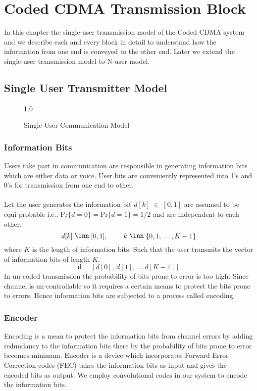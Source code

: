 \chapter{Coded CDMA Transmission Block}
In this chapter the single-user transmission model of the Coded CDMA system and we describe each and every block in detail to understand how the information from one end is conveyed to the other end. Later we extend the single-user transmission model to N-user model.
\section{Single User Transmitter Model}
\begin{figure}[htb]
\centerline{  {1.0} }
\caption{Single User Communication Model}
\end{figure}
\subsection{Information Bits}
Users take part in communication are responsible in generating information bits which are either data or voice. User bits are conveniently represented into 1's and 0's for transmission from one end to other.\\ \\
Let the user generates the information bit $d[k]\;\in\;[0,1]$ are assumed to be equi-probable i.e., $\mathrm{Pr}\{d=0\}=\mathrm{Pr}\{d=1\}=1/2$ and are independent to each other.
\begin{equation}
d[k]\;\in\;[0,1],\hspace{8mm} k\;\in\;\{0,1,\dots,K-1\}
\end{equation}
where $K$ is the length of information bits. Such that the user transmits the vector of information bits of length $K$. 
\begin{equation}
\mathrm{\mathbf{d}}=[d[0],\,d[1],\dots,d[K-1]]
\end{equation}
In un-coded transmission the probability of bits prone to error is too high. Since channel is un-controllable so it requires a certain means to protect the bits prone to errors. Hence information bits are subjected to a process called encoding.
\subsection{Encoder}
Encoding is a mean to protect the information bits from channel errors by adding redundancy to the information bits there by the probability of bits prone to error becomes minimum. Encoder is a device which incorporates Forward Error Correction codes (FEC) takes the information bits as input and gives the encoded bits as output. We employ convolutional codes in our system to encode the information bits.

